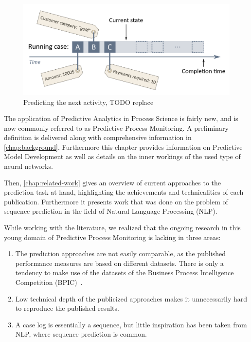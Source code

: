 \begin{figure}
    \centering
    \includegraphics[width=\textwidth]{gfx/next-activity.png}
    \caption{Predicting the next activity, TODO replace}
    \label{fig:next-activity-prediction}
\end{figure}

The application of Predictive Analytics in Process Science is fairly new, and is now commonly referred to as Predictive Process Monitoring. A preliminary definition is delivered along with comprehensive information in \autoref{chap:background}. Furthermore this chapter provides information on Predictive Model Development as well as details on the inner workings of the used type of neural networks.

Then, \autoref{chap:related-work} gives an overview of current approaches to the prediction task at hand, highlighting the achievements and technicalities of each publication. Furthermore it presents work that was done on the problem of sequence prediction in the field of Natural Language Processing (NLP).

While working with the literature, we realized that the ongoing research in this young domain of Predictive Process Monitoring is lacking in three areas:

\begin{enumerate}
    \item The prediction approaches are not easily comparable, as the published performance measures are based on different datasets. There is only a tendency to make use of the datasets of the Business Process Intelligence Competition (BPIC)~\cite{BPIC2011, BPIC2012, BPIC2017}.
    \item Low technical depth of the publicized approaches makes it unnecessarily hard to reproduce the published results.
    \item A case log is essentially a sequence, but little inspiration has been taken from NLP, where sequence prediction is common.
\end{enumerate}

